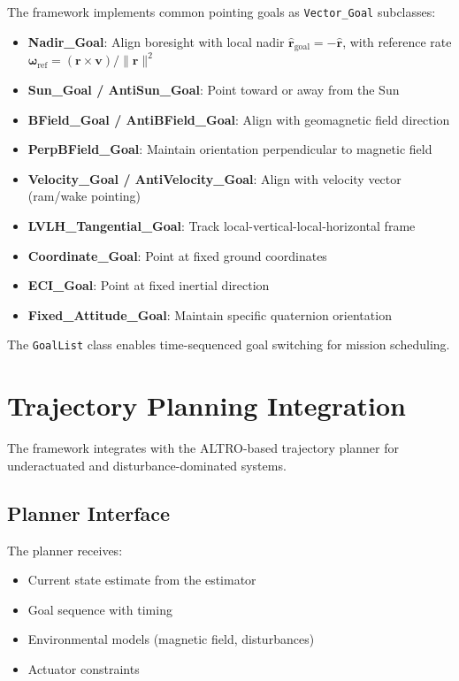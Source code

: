 \documentclass[conference]{IEEEtran}
\begin{document}
The framework implements common pointing goals as \texttt{Vector\_Goal} subclasses:

\begin{itemize}
    \item \textbf{Nadir\_Goal}: Align boresight with local nadir $\hat{\mathbf{r}}_{\text{goal}} = -\hat{\mathbf{r}}$, with reference rate $\boldsymbol{\omega}_{\text{ref}} = (\mathbf{r} \times \mathbf{v})/\|\mathbf{r}\|^2$
    \item \textbf{Sun\_Goal / AntiSun\_Goal}: Point toward or away from the Sun
    \item \textbf{BField\_Goal / AntiBField\_Goal}: Align with geomagnetic field direction
    \item \textbf{PerpBField\_Goal}: Maintain orientation perpendicular to magnetic field
    \item \textbf{Velocity\_Goal / AntiVelocity\_Goal}: Align with velocity vector (ram/wake pointing)
    \item \textbf{LVLH\_Tangential\_Goal}: Track local-vertical-local-horizontal frame
    \item \textbf{Coordinate\_Goal}: Point at fixed ground coordinates
    \item \textbf{ECI\_Goal}: Point at fixed inertial direction
    \item \textbf{Fixed\_Attitude\_Goal}: Maintain specific quaternion orientation
\end{itemize}

The \texttt{GoalList} class enables time-sequenced goal switching for mission scheduling.



\section{Trajectory Planning Integration}\label{sec:planning}

The framework integrates with the ALTRO-based trajectory planner for underactuated and disturbance-dominated systems.

\subsection{Planner Interface}\label{subsec:planner_interface}

The planner receives:
\begin{itemize}
    \item Current state estimate from the estimator
    \item Goal sequence with timing
    \item Environmental models (magnetic field, disturbances)
    \item Actuator constraints
\end{itemize}
\end{document}
